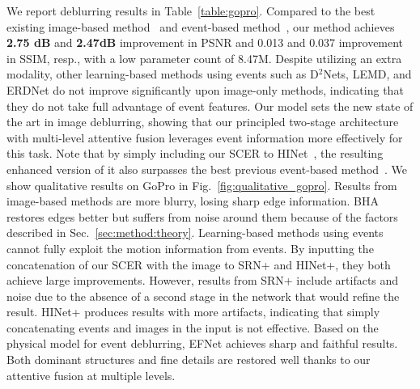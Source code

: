 \documentclass[runningheads]{llncs}
\newcommand{\PAR}[1]{\noindent{\bf #1}}
\newlength \g
\begin{document}
\PAR{GoPro dataset.}
We report deblurring results in Table~\ref{table:gopro}. Compared to the best existing image-based method~\cite{chen2021hinet} and event-based method~\cite{haoyu2020learning}, our method achieves \textbf{2.75 dB} and \textbf{2.47dB} improvement in PSNR and 0.013 and 0.037 improvement in SSIM, resp., with a low parameter count of 8.47M. Despite utilizing an extra modality, other learning-based methods using events such as D$^{2}$Nets, LEMD, and ERDNet do not improve significantly upon image-only methods, indicating that they do not take full advantage of event features. Our model sets the new state of the art in image deblurring, showing that our principled two-stage architecture with multi-level attentive fusion leverages event information more effectively for this task. Note that by simply including our SCER to HINet~\cite{chen2021hinet}, the resulting enhanced version of it also surpasses the best previous event-based method~\cite{haoyu2020learning}. We show qualitative results on GoPro in Fig.~\ref{fig:qualitative_gopro}. Results from image-based methods are more blurry, losing sharp edge information. BHA~\cite{pan2019bringing_high_framerate} restores edges better but suffers from noise around them because of the factors described in Sec.~\ref{sec:method:theory}. Learning-based methods using events cannot fully exploit the motion information from events. By inputting the concatenation of our SCER with the image to SRN+ and HINet+, they both achieve large improvements. However, results from SRN+ include artifacts and noise due to the absence of a second stage in the network that would refine the result. HINet+ produces results with more artifacts, indicating that simply concatenating events and images in the input is not effective. Based on the physical model for event deblurring, EFNet achieves sharp and faithful results. Both dominant structures and fine details are restored well thanks to our attentive fusion at multiple levels.
\end{document}
